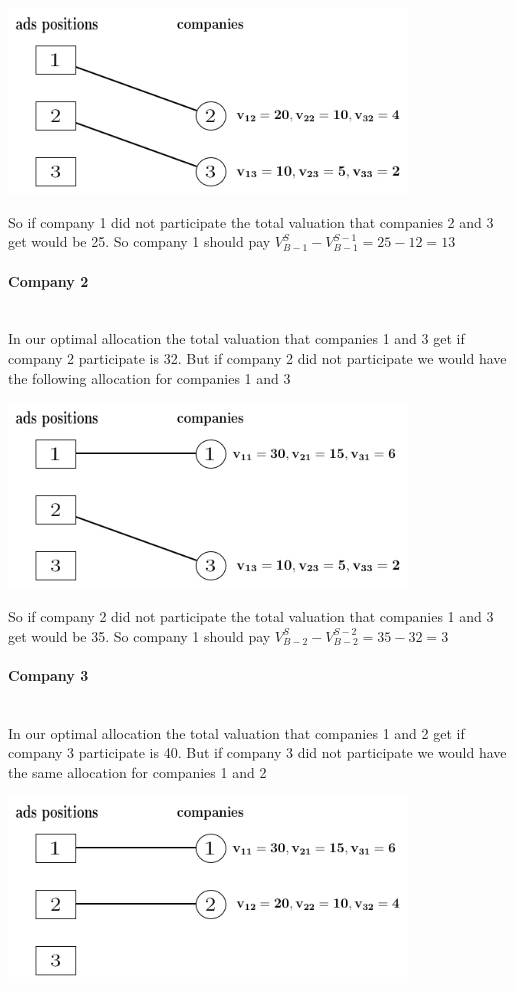 \documentclass{article}
\begin{document}
\centerline{
\includegraphics[width=300pt]{case1.jpg}}

So if company 1 did not participate the total valuation that companies 2 and 3 get would be 25. So company 1 should pay $V_{B-1}^{S}-V_{B-1}^{S-1}=25-12=13$

\paragraph{Company 2} \mbox{}\\
In our optimal allocation the total valuation that companies 1 and 3 get if company 2 participate is 32. But if company 2 did not participate we would have the following allocation for companies 1 and 3

\centerline{
\includegraphics[width=300pt]{case2.jpg}}

So if company 2 did not participate the total valuation that companies 1 and 3 get would be 35. So company 1 should pay $V_{B-2}^{S}-V_{B-2}^{S-2}=35-32=3$

\paragraph{Company 3} \mbox{}\\
In our optimal allocation the total valuation that companies 1 and 2 get if company 3 participate is 40. But if company 3 did not participate we would have the same allocation for companies 1 and 2

\centerline{
\includegraphics[width=300pt]{case3.jpg}}
\end{document}
